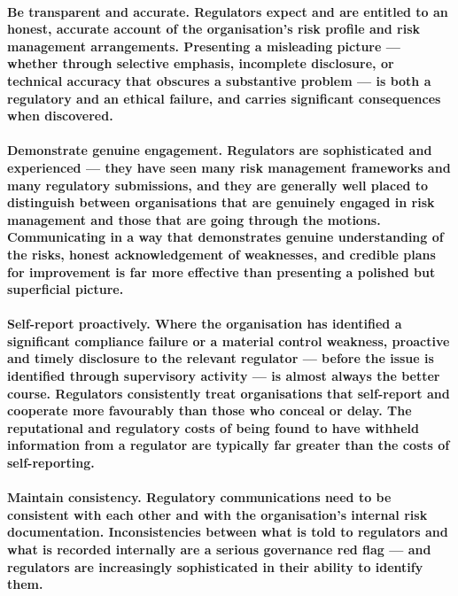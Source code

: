 \paragraph{\textbf{Be transparent and accurate}. Regulators expect and are entitled to an honest, accurate account of the organisation's risk profile and risk management arrangements. Presenting a misleading picture — whether through selective emphasis, incomplete disclosure, or technical accuracy that obscures a substantive problem — is both a regulatory and an ethical failure, and carries significant consequences when discovered.}
\paragraph{\textbf{Demonstrate genuine engagement}. Regulators are sophisticated and experienced — they have seen many risk management frameworks and many regulatory submissions, and they are generally well placed to distinguish between organisations that are genuinely engaged in risk management and those that are going through the motions. Communicating in a way that demonstrates genuine understanding of the risks, honest acknowledgement of weaknesses, and credible plans for improvement is far more effective than presenting a polished but superficial picture.}
\paragraph{\textbf{Self-report proactively}. Where the organisation has identified a significant compliance failure or a material control weakness, proactive and timely disclosure to the relevant regulator — before the issue is identified through supervisory activity — is almost always the better course. Regulators consistently treat organisations that self-report and cooperate more favourably than those who conceal or delay. The reputational and regulatory costs of being found to have withheld information from a regulator are typically far greater than the costs of self-reporting.}
\paragraph{\textbf{Maintain consistency}. Regulatory communications need to be consistent with each other and with the organisation's internal risk documentation. Inconsistencies between what is told to regulators and what is recorded internally are a serious governance red flag — and regulators are increasingly sophisticated in their ability to identify them.}

